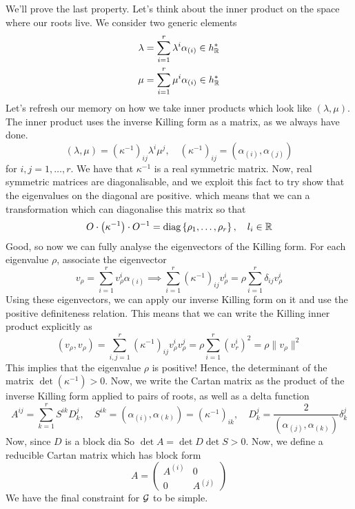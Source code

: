 We'll prove the last property. 
Let's think about the inner product on the space where 
our roots live. We consider 
two generic elements 
\begin{align*}
\lambda &=  \sum_{ i = 1 } ^ r \lambda ^ i \alpha _{ ( i )  } \in h_{ \mathbb{R} } ^ *  \\ 
\mu &=  \sum_{ i = 1} ^ r \mu ^ i \alpha _{ \left( i  \right)  } \in h_{ \mathbb{R} } ^ *    
\end{align*}
Let's refresh our memory on how we take inner products 
which look like $ \left( \lambda , \mu   \right)  $. 
The inner product uses the inverse Killing form as a matrix, as we 
always have done. 
\[
\left( \lambda , \mu  \right)   = \left( \kappa ^{ - 1}  \right)  _{ ij } \lambda ^ i \mu ^ j , 
\quad \left( \kappa ^{ - 1}  \right)  _{ ij}  = \left( \alpha _{ \left( i  \right)  } , \alpha_{ \left( j  \right)  }  \right)  
\]  for $ i, j = 1 , \dots , r  $. 
We have that $ \kappa ^{ - 1} $ is a real symmetric matrix. 
Now, real symmetric matrices are diagonalisable, and we 
exploit this fact to try show that the eigenvalues 
on the diagonal are positive. 
which means that we can a transformation 
which can diagonalise this matrix so that 
\[
O \cdot  \left( \kappa ^{ - 1}  \right)  \cdot  O ^{ - 1}  = \text{diag} \left\{  \rho_1, \dots , \rho _ r  \right\}  , 
\quad l_i \in \mathbb{R} 
\]  Good, so now we can fully analyse the 
eigenvectors of the Killing form. For each eigenvalue $ \rho $, associate the eigenvector 
\[
v _{ \rho }  = \sum _{ i = 1} ^ r v _{ \rho } ^ i \alpha _{ \left( i  \right)  } \implies 
\sum _{ i = 1  }^ r \left( \kappa ^{ - 1}  \right)  _{ ij } v _{ \rho } ^ i  = \rho \sum _{ i = 1 } ^ r 
\delta _{ ij } v _{ \rho } ^ i 
\] Using these eigenvectors, 
we can apply our inverse Killing form on it and 
use the positive definiteness relation. This means that we 
can write the Killing inner product explicitly as 
\[
\left( v _{ \rho } , v _{ \rho }  \right)   = 
\sum_{ i, j = 1 } ^ r \left( \kappa ^{ - 1}  \right)  _{ ij } v _{ \rho } ^ i v _{ \rho } ^ j  = \rho \sum _{ i = 1 }^ r 
\left( v _ r ^ i  \right)  ^ 2 = \rho \| v _{ \rho } \| ^ 2 
\] This implies that the eigenvalue $ \rho $ is positive!
Hence, the determinant of the matrix $\det \left( \kappa ^{ - 1}  \right)  > 0 $. 
Now, we write the Cartan matrix as the product of the inverse 
Killing form applied to pairs of roots, as well as a delta function 
\[
A ^{ ij }  = \sum_{ k = 1} ^ r S ^{ ik } D_ k ^ j , \quad S ^{ ik } = \left( \alpha _{ \left( i  \right)  } , 
\alpha _{ \left( k  \right)   }  \right) = \left( \kappa ^{ - 1}  \right)  _{ ik }  , 
\quad D ^ j _ k  = \frac{ 2 }{ \left( \alpha _{ \left( j  \right)  } ,  \alpha _{ \left( k  \right)  } \right)  } 
\delta ^{ j }_ k 
\] Now, since $ D $ is a block dia So $ \det A   = \det D \det S  > 0  $. 
Now, we define a reducible Cartan matrix which 
has block form 
\[
 A  = \begin{pmatrix}  A^{ ( i ) } & 0 \\ 0 & A ^{ \left( j  \right)  }  \end{pmatrix}  
\] We have the final constraint for $ \mathcal{ G } $ to be simple. 

